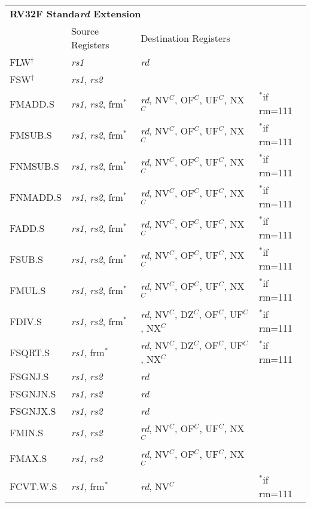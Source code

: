 \begin{tabular}{p{25mm}|p{3cm}|p{6cm}|p{10cm}}
  \multicolumn{4}{l}{\bf RV32F Standa{\em rd} Extension} \\
  \cline{2-3}
   & Source Registers & Destination Registers \\
  \cline{2-3}
   FLW$^\dagger$ & {\em rs1} & {\em rd} &  \\
   \cline{2-3}
   FSW$^\dagger$ & {\em rs1}, {\em rs2} &  &  \\
   \cline{2-3}
   FMADD.S & {\em rs1}, {\em rs2}, frm$^*$ & {\em rd}, NV$^C$, OF$^C$, UF$^C$, NX$^C$ & $^*$if rm=111 \\
   \cline{2-3}
   FMSUB.S & {\em rs1}, {\em rs2}, frm$^*$ & {\em rd}, NV$^C$, OF$^C$, UF$^C$, NX$^C$ & $^*$if rm=111 \\
   \cline{2-3}
   FNMSUB.S & {\em rs1}, {\em rs2}, frm$^*$ & {\em rd}, NV$^C$, OF$^C$, UF$^C$, NX$^C$ & $^*$if rm=111 \\
   \cline{2-3}
   FNMADD.S & {\em rs1}, {\em rs2}, frm$^*$ & {\em rd}, NV$^C$, OF$^C$, UF$^C$, NX$^C$ & $^*$if rm=111 \\
   \cline{2-3}
   FADD.S & {\em rs1}, {\em rs2}, frm$^*$ & {\em rd}, NV$^C$, OF$^C$, UF$^C$, NX$^C$ & $^*$if rm=111 \\
   \cline{2-3}
   FSUB.S & {\em rs1}, {\em rs2}, frm$^*$ & {\em rd}, NV$^C$, OF$^C$, UF$^C$, NX$^C$ & $^*$if rm=111 \\
   \cline{2-3}
   FMUL.S & {\em rs1}, {\em rs2}, frm$^*$ & {\em rd}, NV$^C$, OF$^C$, UF$^C$, NX$^C$ & $^*$if rm=111 \\
   \cline{2-3}
   FDIV.S & {\em rs1}, {\em rs2}, frm$^*$ & {\em rd}, NV$^C$, DZ$^C$, OF$^C$, UF$^C$, NX$^C$ & $^*$if rm=111 \\
   \cline{2-3}
   FSQRT.S & {\em rs1}, frm$^*$ & {\em rd}, NV$^C$, DZ$^C$, OF$^C$, UF$^C$, NX$^C$ & $^*$if rm=111 \\
   \cline{2-3}
   FSGNJ.S & {\em rs1}, {\em rs2} & {\em rd} &  \\
   \cline{2-3}
   FSGNJN.S & {\em rs1}, {\em rs2} & {\em rd} &  \\
   \cline{2-3}
   FSGNJX.S & {\em rs1}, {\em rs2} & {\em rd} &  \\
   \cline{2-3}
   FMIN.S & {\em rs1}, {\em rs2} & {\em rd}, NV$^C$, OF$^C$, UF$^C$, NX$^C$ &  \\
   \cline{2-3}
   FMAX.S & {\em rs1}, {\em rs2} & {\em rd}, NV$^C$, OF$^C$, UF$^C$, NX$^C$ &  \\
   \cline{2-3}
   FCVT.W.S & {\em rs1}, frm$^*$ & {\em rd}, NV$^C$ & $^*$if rm=111 \\

\end{tabular}
